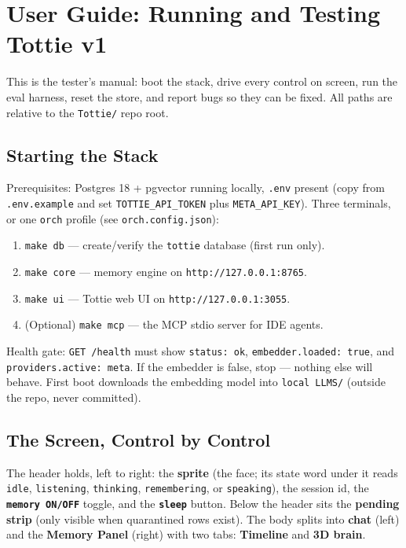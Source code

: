 \chapter{User Guide: Running and Testing Tottie v1}

This is the tester's manual: boot the stack, drive every control on screen, run
the eval harness, reset the store, and report bugs so they can be fixed. All paths
are relative to the \texttt{Tottie/} repo root.

\section{Starting the Stack}
Prerequisites: Postgres 18 + pgvector running locally, \texttt{.env} present (copy
from \texttt{.env.example} and set \texttt{TOTTIE\_API\_TOKEN} plus \texttt{META\_API\_KEY}).
Three terminals, or one \texttt{orch} profile (see \texttt{orch.config.json}):
\begin{enumerate}
  \item \texttt{make db} --- create/verify the \texttt{tottie} database (first run only).
  \item \texttt{make core} --- memory engine on \texttt{http://127.0.0.1:8765}.
  \item \texttt{make ui} --- Tottie web UI on \texttt{http://127.0.0.1:3055}.
  \item (Optional) \texttt{make mcp} --- the MCP stdio server for IDE agents.
\end{enumerate}
Health gate: \texttt{GET /health} must show \texttt{status: ok},
\texttt{embedder.loaded: true}, and \texttt{providers.active: meta}. If the embedder
is false, stop --- nothing else will behave. First boot downloads the embedding model
into \texttt{local LLMS/} (outside the repo, never committed).

\section{The Screen, Control by Control}
The header holds, left to right: the \textbf{sprite} (the face; its state word under it
reads \texttt{idle}, \texttt{listening}, \texttt{thinking}, \texttt{remembering}, or
\texttt{speaking}), the session id, the \textbf{\texttt{memory ON/OFF}} toggle, and the
\textbf{\texttt{sleep}} button. Below the header sits the \textbf{pending strip} (only
visible when quarantined rows exist). The body splits into \textbf{chat} (left) and the
\textbf{Memory Panel} (right) with two tabs: \textbf{Timeline} and \textbf{3D brain}.

